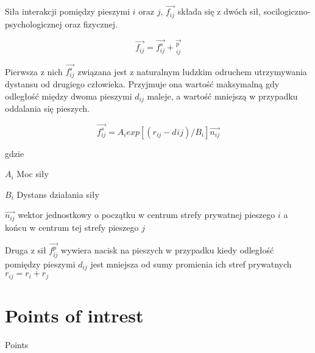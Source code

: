 Siła interakcji pomiędzy pieszymi $i$ oraz $j$, $\vec{f_{ij}}$ składa się z dwóch sił, socilogiczno-psychologicznej oraz fizycznej. 

\begin{equation}
\vec{f_{ij}} = \vec{f_{ij}^{s}} + \vec{_{ij}^{p}}
\end{equation}

Pierwsza z nich $\vec{f_{ij}^{s}}$ związana jest z naturalnym ludzkim odruchem utrzymywania dystansu od drugiego człowieka. Przyjmuje ona wartość maksymalną gdy odległość między dwoma pieszymi $d_{ij}$ maleje, a wartość mniejszą w przypadku oddalania się pieszych.

\begin{equation}
\vec{f_{ij}^{s}} = A_{i} exp[(r_{ij} - d_{}ij) / B_{i}]\vec{n_{ij}}
\end{equation}

gdzie
\begin{eqwhere}[2cm]
	\item[$A_{i}$] Moc siły
	\item[$B_{i}$] Dystans działania siły
	\item[$\vec{n_{ij}}$] wektor jednostkowy o początku w centrum strefy prywatnej pieszego $i$ a końcu w centrum tej strefy pieszego $j$
\end{eqwhere}

Druga z sił $\vec{f_{ij}^{p}}$ wywiera nacisk na pieszych w przypadku kiedy odległość pomiędzy pieszymi $d_{ij}$ jest mniejsza od sumy promienia ich stref prywatnych $r_{ij} = r_{i} + r_{j}$

\section{Points of intrest}
\label{sec:pointsOfInterest}
 Points
